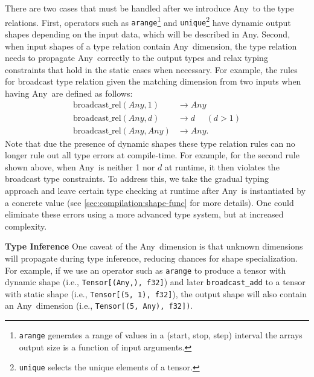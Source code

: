         There are two cases that must be handled after we introduce Any~to the type relations.
        First, operators such as {\tt arange}\footnote{{\tt arange} generates a range of values in a (start, stop, step) interval the arrays output size is a function of input arguments.} and {\tt unique}\footnote{{\tt unique} selects the unique elements of a tensor.} have dynamic output shapes depending on the input data, which will be described in Any.
        Second, when input shapes of a type relation contain Any~dimension, the type relation needs to propagate Any~correctly to the output types and relax typing constraints that hold in the static cases when necessary.
        For example, the rules
        for broadcast type relation given the matching dimension from two inputs when having Any~are defined as follows:
        \begin{align*}
          \textrm{broadcast\_rel}(Any, 1) &\rightarrow Any \\
          \textrm{broadcast\_rel}(Any, d) &\rightarrow d ~~~~~~(d > 1) \\
          \textrm{broadcast\_rel}(Any, Any) &\rightarrow Any.
        \end{align*}
        Note that due the presence of dynamic shapes these type relation rules can no longer rule out all type errors at compile-time.
        For example, for the second rule shown above, when Any~is neither 1 nor $d$ at runtime, it then violates the broadcast type constraints.
        To address this, we take the gradual typing~\citep{gradualtyping} approach and leave certain type checking at runtime after Any~is instantiated by a
        concrete value (see \autoref{sec:compilation:shape-func} for more details).
        One could eliminate these errors using a more advanced type system, but at increased complexity.

        \noindent
        {\bf Type Inference} One caveat of the Any~dimension is that unknown dimensions will propagate during type inference, reducing chances for shape specialization.
        For example, if we use an operator such as {\tt arange} to produce a tensor with dynamic shape (i.e., \texttt{Tensor[(Any,), f32]}) and later {\tt broadcast\_add} to a tensor with static shape (i.e., \texttt{Tensor[(5, 1), f32]}), the output shape will also contain an Any~dimension (i.e., \texttt{Tensor[(5, Any), f32])}.

